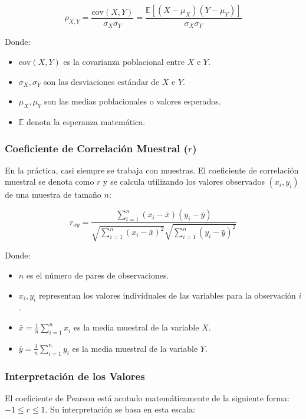 \documentclass[12pt]{article}
\begin{document}
\begin{equation}
\rho_{X,Y} = \frac{\text{cov}(X,Y)}{\sigma_X \sigma_Y} = \frac{\mathbb{E}[(X - \mu_X)(Y - \mu_Y)]}{\sigma_X \sigma_Y}
\end{equation}

Donde:
\begin{itemize}
    \item $\text{cov}(X,Y)$ es la covarianza poblacional entre $X$ e $Y$.
    \item $\sigma_X, \sigma_Y$ son las desviaciones estándar de $X$ e $Y$.
    \item $\mu_X, \mu_Y$ son las medias poblacionales o valores esperados.
    \item $\mathbb{E}$ denota la esperanza matemática.
\end{itemize}

\subsubsection*{Coeficiente de Correlación Muestral ($r$)}

En la práctica, casi siempre se trabaja con muestras. El coeficiente de correlación muestral se denota como $r$ y se calcula utilizando los valores observados $(x_i, y_i)$ de una muestra de tamaño $n$\cite{ref1}:

\begin{equation}
r_{xy} = \frac{\sum_{i=1}^{n} (x_i - \bar{x})(y_i - \bar{y})}{\sqrt{\sum_{i=1}^{n} (x_i - \bar{x})^2} \sqrt{\sum_{i=1}^{n} (y_i - \bar{y})^2}}
\end{equation}

Donde:
\begin{itemize}
    \item $n$ es el número de pares de observaciones.
    \item $x_i, y_i$ representan los valores individuales de las variables para la observación $i$.
    \item $\bar{x} = \frac{1}{n}\sum_{i=1}^n x_i$ es la media muestral de la variable $X$.
    \item $\bar{y} = \frac{1}{n}\sum_{i=1}^n y_i$ es la media muestral de la variable $Y$.
\end{itemize}

\subsubsection*{Interpretación de los Valores}

El coeficiente de Pearson está acotado matemáticamente de la siguiente forma: $-1 \leq r \leq 1$. Su interpretación se basa en esta escala:
\end{document}
